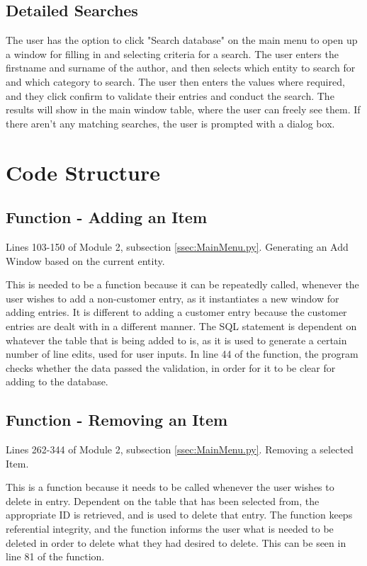 \subsection{Detailed Searches}

The user has the option to click "Search database" on the main menu to open up a window for filling in and selecting criteria for a search. The user enters the firstname and surname of the author, and then selects which entity to search for and which category to search. The user then enters the values where required, and they click confirm to validate their entries and conduct the search. The results will show in the main window table, where the user can freely see them. If there aren't any matching searches, the user is prompted with a dialog box.

\section{Code Structure}

\subsection{Function - Adding an Item}
Lines 103-150 of Module 2, subsection \ref{ssec:MainMenu.py}. Generating an Add Window based on the current entity.
\begin{tiny}
\end{tiny}
This is needed to be a function because it can be repeatedly called, whenever the user wishes to add a non-customer entry, as it instantiates a new window for adding entries. It is different to adding a customer entry because the customer entries are dealt with in a different manner. The SQL statement is dependent on whatever the table that is being added to is, as it is used to generate a certain number of line edits, used for user inputs. In line 44 of the function, the program checks whether the data passed the validation, in order for it to be clear for adding to the database.

\subsection{Function - Removing an Item}
Lines 262-344 of Module 2, subsection \ref{ssec:MainMenu.py}. Removing a selected Item.
\begin{tiny}
\end{tiny}
This is a function because it needs to be called whenever the user wishes to delete in entry. Dependent on the table that has been selected from, the appropriate ID is retrieved, and is used to delete that entry. The function keeps referential integrity, and the function informs the user what is needed to be deleted in order to delete what they had desired to delete. This can be seen in line 81 of the function.

